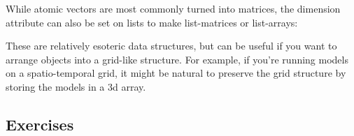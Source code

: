 \begin{Shaded}
\begin{Highlighting}[]
\NormalTok{(}\NormalTok{:}\NormalTok{)                   }
\NormalTok{(}\NormalTok{(}\NormalTok{:}\NormalTok{, } \NormalTok{)) }
\NormalTok{(}\NormalTok{(}\NormalTok{:}\NormalTok{, } \NormalTok{)) }
\NormalTok{(}\NormalTok{(}\NormalTok{:}\NormalTok{, }\NormalTok{))         }
\end{Highlighting}
\end{Shaded}

While atomic vectors are most commonly turned into matrices, the
dimension attribute can also be set on lists to make list-matrices or
list-arrays:

\begin{Shaded}
\begin{Highlighting}[]
\StringTok{ }\NormalTok{(}\NormalTok{:}\NormalTok{, }\NormalTok{, }\NormalTok{, }\NormalTok{)}
\StringTok{ }\NormalTok{(}\NormalTok{, }\NormalTok{)}
\CommentTok{#>      [,1]      [,2]}
\end{Highlighting}
\end{Shaded}

These are relatively esoteric data structures, but can be useful if you
want to arrange objects into a grid-like structure. For example, if
you're running models on a spatio-temporal grid, it might be natural to
preserve the grid structure by storing the models in a 3d array.

\subsection{Exercises}\label{exercises-2}

